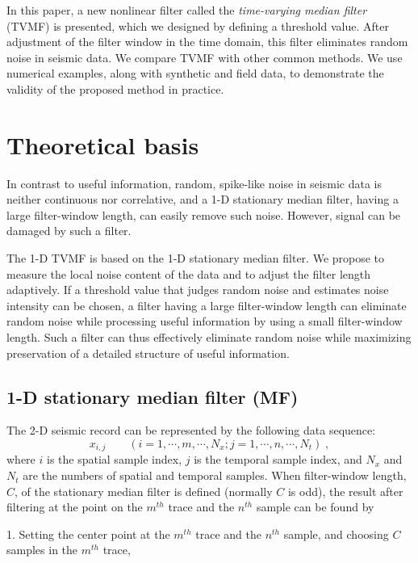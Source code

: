 In this paper, a new nonlinear filter called the \emph{time-varying median filter} (TVMF) 
is presented, which we designed by defining a threshold value. After adjustment 
of the filter window in the time domain, this filter eliminates 
random noise in seismic data. We compare TVMF with other common methods.
We use numerical examples, along with synthetic and field data, to demonstrate 
the validity of the proposed method in practice.

\section{Theoretical basis}

In contrast to useful information, random, spike-like noise in seismic data is 
neither continuous nor correlative, and a 1-D stationary median filter, having 
a large filter-window length, can easily remove such noise. However,
signal can be damaged by such a filter.

The 1-D TVMF is based on the 1-D stationary median filter. We propose to measure
the local noise content of the data and to adjust the filter length adaptively.
If a threshold value that judges random noise and estimates noise intensity can 
be chosen, a filter having a large filter-window length can eliminate random noise 
while processing useful information by using a small filter-window length. 
Such a filter can thus effectively eliminate random noise while maximizing 
preservation of a detailed structure of useful information. 

 \subsection{1-D stationary median filter (MF)}

The 2-D seismic record can be represented by the following data sequence:
      \begin{equation}
        \label{eq:eq1}
          x_{i,j} \qquad (i=1,\cdots,m,\cdots,N_x;j=1,\cdots,n,\cdots,N_t)\;,
      \end{equation}
where $i$ is the spatial sample index, $j$ is the temporal sample index, and 
$N_x$ and $N_t$ are the numbers of spatial and temporal samples. When filter-window 
length, $C$, of the stationary median filter is defined (normally $C$ is odd), 
the result after filtering at the point on the $m^{th}$ trace and the $n^{th}$ sample 
can be found by

1. Setting the center point at the $m^{th}$ trace and the $n^{th}$ sample, and 
choosing $C$ samples in the $m^{th}$ trace,

